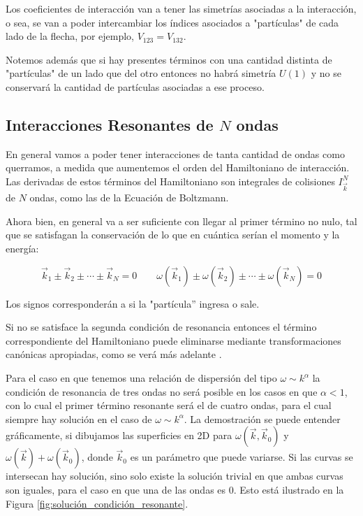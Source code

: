Los coeficientes de interacción van a tener las simetrías asociadas a la interacción, o sea, se van a poder intercambiar los índices asociados a "partículas" de cada lado de la flecha, por ejemplo, $V_{123}=V_{132}$.

Notemos además que si hay presentes términos con una cantidad distinta de "partículas" de un lado que del otro entonces no habrá simetría $U(1)$ y no se conservará la cantidad de partículas asociadas a ese proceso. 


\subsection*{Interacciones Resonantes de $N$ ondas} %
En general vamos a poder tener interacciones de tanta cantidad de ondas como querramos, a medida que aumentemos el orden del Hamiltoniano de interacción. Las derivadas de estos términos del Hamiltoniano son integrales de colisiones $I_{\vec k}^N$ de $N$ ondas, como las de la Ecuación de Boltzmann. 

Ahora bien, en general va a ser suficiente con llegar al primer término no nulo, tal que se satisfagan la conservación de lo que en cuántica serían el momento y la energía: 

\begin{equation}
	\vec k_1 \pm \vec k_2 \pm \cdots \pm \vec k_N = 0 \qquad \omega(\vec k_1) \pm \omega(\vec k_2) \pm \cdots \pm \omega(\vec k_N) = 0
	\label{eq:condición_resonancia}
\end{equation}

Los signos corresponderán a si la "partícula'' ingresa o sale. 

Si no se satisface la segunda condición de resonancia entonces el término correspondiente del Hamiltoniano puede eliminarse mediante transformaciones canónicas apropiadas, como se verá más adelante \cite{zakharovKolmogorovSpectraTurbulence1992}.

Para el caso en que tenemos una relación de dispersión del tipo $\omega\sim k^{\alpha}$ la condición de resonancia de tres ondas no será posible en los casos en que $\alpha<1$, con lo cual el primer término resonante será el de cuatro ondas, para el cual siempre hay solución en el caso de $\omega\sim k^{\alpha}$. La demostración se puede entender gráficamente, si dibujamos las superficies en 2D para $\omega(\vec k, \vec k_0)$ y $\omega(\vec k) + \omega(\vec k_0)$, donde $\vec k_0$ es un parámetro que puede variarse. Si las curvas se intersecan hay solución, sino solo existe la solución trivial en que ambas curvas son iguales, para el caso en que una de las ondas es 0. Esto está ilustrado en la Figura \ref{fig:solución_condición_resonante}. %

